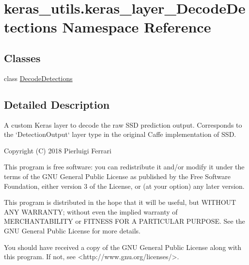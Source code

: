 \hypertarget{namespacekeras__utils_1_1keras__layer___decode_detections}{}\section{keras\+\_\+utils.\+keras\+\_\+layer\+\_\+\+Decode\+Detections Namespace Reference}
\label{namespacekeras__utils_1_1keras__layer___decode_detections}
\subsection*{Classes}
\begin{DoxyCompactItemize}
\item 
class \hyperlink{classkeras__utils_1_1keras__layer___decode_detections_1_1_decode_detections}{Decode\+Detections}
\end{DoxyCompactItemize}


\subsection{Detailed Description}
\begin{DoxyVerb}A custom Keras layer to decode the raw SSD prediction output. Corresponds to the
`DetectionOutput` layer type in the original Caffe implementation of SSD.

Copyright (C) 2018 Pierluigi Ferrari

This program is free software: you can redistribute it and/or modify
it under the terms of the GNU General Public License as published by
the Free Software Foundation, either version 3 of the License, or
(at your option) any later version.

This program is distributed in the hope that it will be useful,
but WITHOUT ANY WARRANTY; without even the implied warranty of
MERCHANTABILITY or FITNESS FOR A PARTICULAR PURPOSE.  See the
GNU General Public License for more details.

You should have received a copy of the GNU General Public License
along with this program.  If not, see <http://www.gnu.org/licenses/>.
\end{DoxyVerb}
 